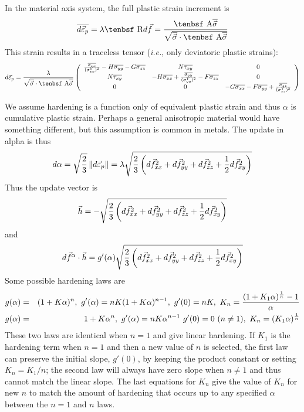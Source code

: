\documentclass[11pt]{article}
\def\A{\hbox{\tenbsf A}}
\def\dpl{d \vec{\varepsilon}_{p}}
\def\df{d \vec{f}}
\def\dfa{d \vec{f}^\alpha}
\def\R{\hbox{\tenbsf R}}
\def\s#1{\sigma_{#1}}
\def\t#1{\tau_{#1}}
\begin{document}
In the material axis system, the full plastic strain increment is
\begin{equation}
       \overline{\dpl} = \lambda \R\df = {\A \overline{\vec\s{}}\over\sqrt{\overline{\vec\s{}} \cdot \A \overline{\vec\s{}}}}
\end{equation}
This strain results in a traceless tensor ({\em i.e.}, only deviatoric plastic strains):
\begin{equation}
         \dpl = {\lambda\over \sqrt{\overline{\vec\s{}} \cdot \A \overline{\vec\s{}}}}
         \left( \begin{array}{ccc}
                      {\overline{\s{xx}}\over (\s{xx}^Y)^2} - H\overline{\s{yy}} - G\overline{\s{zz}} & N\overline{\t{xy}} & 0  \\
                       N\overline{\t{xy}} & -H\overline{\s{xx}} + {\overline{\s{yy}}\over (\s{yy}^Y)^2} - F\overline{\s{zz}} & 0  \\
                       0 & 0 & -G\overline{\s{xx}} -F\overline{\s{yy}} +{\overline{\s{zz}}\over (\s{zz}^Y)^2} 
                        \end{array} \right)
\end{equation}

We assume hardening is a function only of equivalent plastic strain and thus $\alpha$ is cumulative plastic strain. Perhaps a general anisotropic material would have something different, but this assumption is common in metals. The update in alpha is thus
\begin{equation}
     d\alpha = \sqrt{2\over 3}\thinspace \| \dpl\| = \lambda \sqrt{{2\over 3}\left(\df_{xx}^2 + \df_{yy}^2 + \df_{zz}^2 + {1\over2}\df_{xy}^2\right)}
\end{equation}
Thus the update vector is
\begin{equation}
      \vec h = - \sqrt{{2\over 3}\left(\df_{xx}^2 + \df_{yy}^2 + \df_{zz}^2 + {1\over2}\df_{xy}^2\right)}
\end{equation}
and
\begin{equation}
   \dfa \cdot \vec h =  g'(\alpha)\sqrt{{2\over 3}\left(\df_{xx}^2 + \df_{yy}^2 + \df_{zz}^2 + {1\over2}\df_{xy}^2\right)}
\end{equation}
Some possible hardening laws are
\begin{eqnarray}
     g(\alpha)  & = & (1 + K\alpha)^n, \  g'(\alpha) =  nK(1+K\alpha)^{n-1}, \  g'(0)=nK, \  K_n={(1+K_1\alpha)^{1\over n} - 1\over \alpha}  \\
     g(\alpha)  & = & 1 + K\alpha^n, \  g'(\alpha) =  nK\alpha^{n-1} \  g'(0)=0\ (n\ne1), \ K_n = (K_1\alpha)^{1\over n}
\end{eqnarray}
These two laws are identical when $n=1$ and give linear hardening. If $K_1$ is the hardening term when $n=1$ and then a new value of $n$ is selected, the first law can preserve the initial slope, $g'(0)$, by keeping the product constant or setting $K_n = K_1/n$; the second law will always have zero slope when $n\ne1$ and thus cannot match the linear slope. The last equations for $K_n$ give the value of $K_n$ for new $n$ to match the amount of hardening that occurs up to any specified $\alpha$ between the $n=1$ and $n$ laws.
\end{document}
